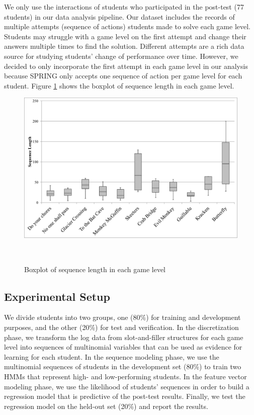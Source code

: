 \documentclass{sigchi}
\def\algname{SPRING\xspace}
\begin{document}
	We only use the interactions of students who participated in the post-test (77 students) in our data analysis pipeline.
	Our dataset includes the records of multiple attempts (sequence of actions) students made to solve each game level.
	Students may struggle with a game level on the first attempt and change their answers multiple times to find the solution.	
	Different attempts are a rich data source for studying students' change of performance over time.	
	However, we decided to  only incorporate the first attempt in each game level in our analysis because \algname only accepts one sequence of action per game level for each student.
	Figure \ref{fig:boxplot} shows the boxplot of sequence length in each game level. 
	\newline	
	\newline	

	\begin{figure}
		\centering
		\includegraphics[width=0.9\columnwidth]{figures/boxplot.pdf}
		\caption{Boxplot of sequence length in each game level}~\label{fig:boxplot}
	\end{figure}
		

	\subsection{Experimental Setup}
	We divide students into two groups, one (80\%) for training and development purposes, and the other (20\%) for test and verification.
	In the discretization phase, we transform the log data from slot-and-filler structures for each game level into sequences of multinomial variables that can be used as evidence for learning for each student.
	In the sequence modeling phase, we use the multinomial sequences of students in the development set (80\%) to train two HMMs that represent high- and low-performing students.
	In the feature vector modeling phase, we use the likelihood of students' sequences in order to build a regression model that is predictive of the post-test results.
	Finally, we test the regression model on the held-out set (20\%) and report the results.
	
\end{document}
